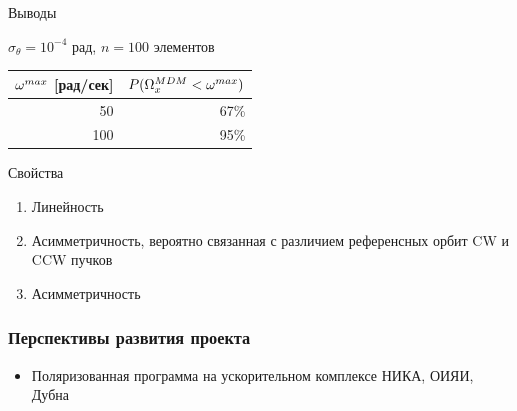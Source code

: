 \documentclass[14pt]{beamer}
\begin{document}
\begin{frame}{Выводы}
	\begin{block}{$\sigma_\theta = 10^{-4}$ рад, $n=100$ элементов}
		\begin{tabular}{r|r}
			\hline
			$\omega^{max}$ [рад/сек] & $P(\Omega_x^{MDM} < \omega^{max})$\\
			\hline
			50  & 67\%\\
			100 & 95\%\\
			\hline
		\end{tabular}
	\end{block}
	\begin{block}{Свойства}
		\begin{enumerate}
			\item Линейность
			\item Асимметричность, вероятно связанная с различием референсных орбит CW и CCW пучков
			\item Асимметричность 
		\end{enumerate}
	\end{block}
\end{frame}
\begin{frame}
\frametitle{Перспективы развития проекта}
\begin{itemize}
  \item Поляризованная программа на ускорительном комплексе НИКА, ОИЯИ, Дубна
\end{itemize}
\end{frame}
\end{document}

